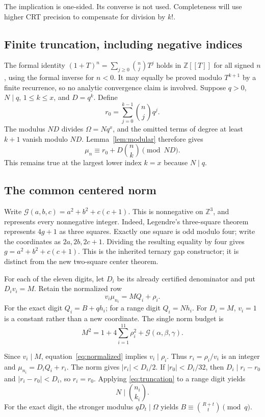 \documentclass[11pt]{article}
\theoremstyle{remark}\newtheorem{remark}[theorem]{Remark}
\newcommand{\Z}{\mathbb Z}\newcommand{\N}{\mathbb N}
\newcommand{\G}{\mathcal G}\newcommand{\LL}{\mathcal L}
\newcommand{\abs}[1]{\lvert #1\rvert}
\begin{document}
The implication is one-sided. Its converse is not used. Completeness
will use higher CRT precision to compensate for division by $k!$.

\subsection{Finite truncation, including negative indices}

The formal identity $(1+T)^n=\sum_{j\ge0}\binom njT^j$ holds
in $\Z[[T]]$ for all signed $n$, using the formal inverse for $n<0$.
It may equally be proved modulo $T^{k+1}$ by a finite recurrence,
so no analytic convergence claim is involved. Suppose $q>0$, $N\mid q$,
$1\le k\le x$, and $D=q^k$. Define
\[
 r_0=\sum_{j=0}^{k-1}\binom njq^j.
\]
The modulus $ND$ divides $\Omega=Nq^x$, and the omitted terms
of degree at least $k+1$ vanish modulo $ND$. Lemma~\ref{lem:modular}
therefore gives
\begin{equation}\label{eq:truncation}
 \mu_n\equiv r_0+D\binom nk\pmod{ND}.
\end{equation}
This remains true at the largest lower index $k=x$ because $N\mid q$.

\subsection{The common centered norm}

Write $\G(a,b,c)=a^2+b^2+c(c+1)$. This is nonnegative on
$\Z^3$, and represents every nonnegative integer. Indeed, Legendre's
three-square theorem represents $4g+1$ as three squares. Exactly one
square is odd modulo four; write the coordinates as $2a,2b,2c+1$.
Dividing the resulting equality by four gives
$g=a^2+b^2+c(c+1)$. This is the inherited ternary gap constructor;
it is distinct from the new two-square center theorem.

For each of the eleven digits, let $D_i$ be its already certified
denominator and put $D_i v_i=M$. Retain the normalized row
\begin{equation}\label{eq:normalized}
 v_i\mu_{n_i}=M Q_i+\rho_i.
\end{equation}
For the exact digit $Q_i=B+q h_i$; for a range digit $Q_i=N h_i$.
For $D_i=M$, $v_i=1$ is a constant rather than a new coordinate.
The single norm budget is
\begin{equation}\label{eq:norm}
 M^2=1+4\sum_{i=1}^{11}\rho_i^2+\G(\alpha,\beta,\gamma).
\end{equation}

Since $v_i\mid M$, equation~\eqref{eq:normalized} implies
$v_i\mid\rho_i$. Thus $r_i=\rho_i/v_i$ is an integer and
$\mu_{n_i}=D_iQ_i+r_i$. The norm gives $\abs{r_i}<D_i/2$.
If $\abs{r_0}<D_i/32$, then $D_i\mid r_i-r_0$ and
$\abs{r_i-r_0}<D_i$, so $r_i=r_0$. Applying
\eqref{eq:truncation} to a range digit yields
\[
                         N\mid\binom{n_i}{k_i}.
\]
For the exact digit, the stronger modulus $qD_t\mid\Omega$
yields $B\equiv\binom{R+t}{t}\pmod q$.
\end{document}
